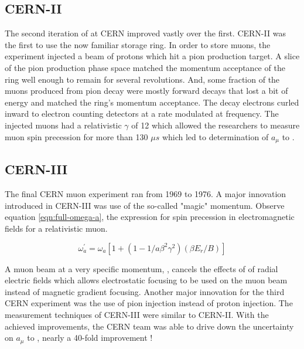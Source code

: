 \subsection{CERN-II}
The second iteration of \mugmtwo at CERN improved vastly over the first.  CERN-II was the first \mugmtwo to use the now familiar storage ring.  In order to store muons, the experiment injected a beam of protons which hit a pion production target.  A slice of the pion production phase space matched the momentum acceptance of the ring well enough to remain for several revolutions. And, some fraction of the muons produced from pion decay were mostly forward decays that lost a bit of energy and matched the ring's momentum acceptance.  The decay electrons curled inward to electron counting detectors at a rate modulated at \gmtwo frequency.  The injected muons had a relativistic $\gamma$ of 12 which allowed the researchers to measure muon spin precession for more than 130 $\mu s$ which led to determination of $a_\mu$ to  \cite{47y-muon-g-2}.

\subsection{CERN-III}
The final CERN muon \gmtwo experiment ran from 1969 to 1976.  A major innovation introduced in CERN-III was use of the so-called "magic" momentum. Observe equation \ref{eqn:full-omega-a}, the expression for spin precession in electromagnetic fields for a relativistic muon.

\begin{equation}
\label{eqn:full-omega-a}
\omega^\prime_a = \omega_a[1 + (1 - 1 / a \beta^2 \gamma^2)(\beta E_r / B)]
\end{equation}

\noindent A muon beam at a very specific momentum, \pmagic, cancels the effects of of radial electric fields which allows electrostatic focusing to be used on the muon beam instead of magnetic gradient focusing.  Another major innovation for the third CERN experiment was the use of pion injection instead of proton injection.  The measurement techniques of CERN-III were similar to CERN-II.  With the achieved improvements, the CERN team was able to drive down the uncertainty on $a_\mu$ to , nearly a 40-fold improvement \cite{47-years}!

